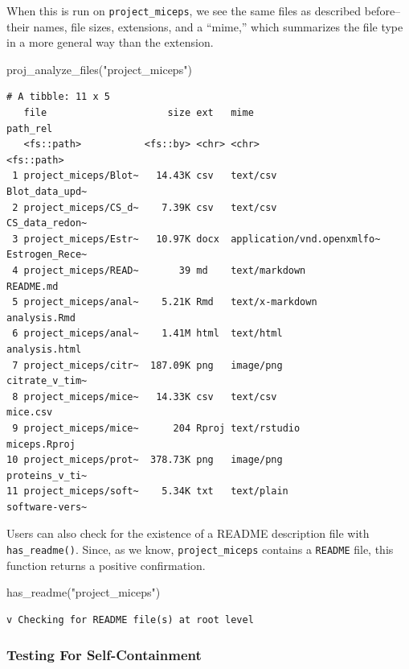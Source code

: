 \documentclass[12pt,twoside]{reedthesis}
\newenvironment{Shaded}{\begin{snugshade}}{\end{snugshade}}
\newcommand{\FunctionTok}[1]{\textcolor[rgb]{0.00,0.00,0.00}{#1}}
\newcommand{\NormalTok}[1]{#1}
\newcommand{\StringTok}[1]{\textcolor[rgb]{0.31,0.60,0.02}{#1}}
\begin{document}
When this is run on \texttt{project\_miceps}, we see the same files as described before--their names, file sizes, extensions, and a ``mime,'' which summarizes the file type in a more general way than the extension.
\begin{Shaded}
\begin{Highlighting}[]
\FunctionTok{proj\_analyze\_files}\NormalTok{(}\StringTok{"project\_miceps"}\NormalTok{)}
\end{Highlighting}
\end{Shaded}
\footnotesize
\begin{verbatim}
# A tibble: 11 x 5
   file                     size ext   mime                       path_rel      
   <fs::path>           <fs::by> <chr> <chr>                      <fs::path>    
 1 project_miceps/Blot~   14.43K csv   text/csv                   Blot_data_upd~
 2 project_miceps/CS_d~    7.39K csv   text/csv                   CS_data_redon~
 3 project_miceps/Estr~   10.97K docx  application/vnd.openxmlfo~ Estrogen_Rece~
 4 project_miceps/READ~       39 md    text/markdown              README.md     
 5 project_miceps/anal~    5.21K Rmd   text/x-markdown            analysis.Rmd  
 6 project_miceps/anal~    1.41M html  text/html                  analysis.html 
 7 project_miceps/citr~  187.09K png   image/png                  citrate_v_tim~
 8 project_miceps/mice~   14.33K csv   text/csv                   mice.csv      
 9 project_miceps/mice~      204 Rproj text/rstudio               miceps.Rproj  
10 project_miceps/prot~  378.73K png   image/png                  proteins_v_ti~
11 project_miceps/soft~    5.34K txt   text/plain                 software-vers~
\end{verbatim}
\normalsize

Users can also check for the existence of a README description file with \texttt{has\_readme()}. Since, as we know, \texttt{project\_miceps} contains a \texttt{README} file, this function returns a positive confirmation.
\begin{Shaded}
\begin{Highlighting}[]
\FunctionTok{has\_readme}\NormalTok{(}\StringTok{"project\_miceps"}\NormalTok{)}
\end{Highlighting}
\end{Shaded}
\begin{verbatim}
v Checking for README file(s) at root level
\end{verbatim}
\hypertarget{testing-for-self-containment}{%
\subsubsection{Testing For Self-Containment}\label{testing-for-self-containment}}
\end{document}
